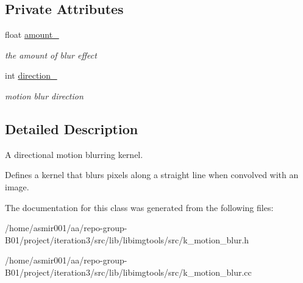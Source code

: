 \subsection*{Private Attributes}
\begin{DoxyCompactItemize}
\item 
float \hyperlink{classimage__tools_1_1KMotionBlur_ada21399075e72161c3b18bc488eb5eec}{amount\+\_\+}\hypertarget{classimage__tools_1_1KMotionBlur_ada21399075e72161c3b18bc488eb5eec}{}\label{classimage__tools_1_1KMotionBlur_ada21399075e72161c3b18bc488eb5eec}

\begin{DoxyCompactList}\small\item\em the amount of blur effect \end{DoxyCompactList}\item 
int \hyperlink{classimage__tools_1_1KMotionBlur_ae0eaeda3f648c6d3a490fbd2ceedc8a0}{direction\+\_\+}\hypertarget{classimage__tools_1_1KMotionBlur_ae0eaeda3f648c6d3a490fbd2ceedc8a0}{}\label{classimage__tools_1_1KMotionBlur_ae0eaeda3f648c6d3a490fbd2ceedc8a0}

\begin{DoxyCompactList}\small\item\em motion blur direction \end{DoxyCompactList}\end{DoxyCompactItemize}


\subsection{Detailed Description}
A directional motion blurring kernel. 

Defines a kernel that blurs pixels along a straight line when convolved with an image. 

The documentation for this class was generated from the following files\+:\begin{DoxyCompactItemize}
\item 
/home/asmir001/aa/repo-\/group-\/\+B01/project/iteration3/src/lib/libimgtools/src/k\+\_\+motion\+\_\+blur.\+h\item 
/home/asmir001/aa/repo-\/group-\/\+B01/project/iteration3/src/lib/libimgtools/src/k\+\_\+motion\+\_\+blur.\+cc\end{DoxyCompactItemize}
